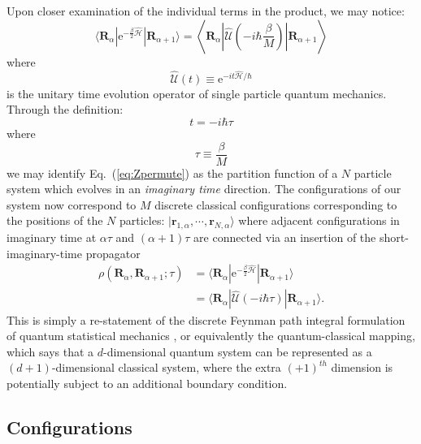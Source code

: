 \documentclass[prb,aps,amssym,nofootinbib,floatfix,notitlepage]{revtex4-1}
\renewcommand{\vec}[1]{\boldsymbol{#1}}
\newcommand{\e}[1]{\mathrm{e}^{#1}}
\renewcommand{\eqref}[1]{Eq.~(\ref{#1})}
\newcommand{\R}{\vec{R}}
\begin{document}
Upon closer examination of the individual terms in the product, we may notice:
%
\begin{equation}
    \langle \R_\alpha | \e{-\frac{\beta}{2}\hat{\mathcal{H}}} | \R_{\alpha+1}
    \rangle = 
    \left \langle \R_\alpha \left | \hat{\mathcal{U}}\left(-i \hbar
    \frac{\beta}{M}\right) \right | \R_{\alpha+1}
    \right \rangle 
\end{equation}
%
where 
%
\begin{equation}
    \hat{\mathcal{U}}(t) \equiv \e{-{i t} \hat{\mathcal{H}}/\hbar}
\end{equation}
%
is the unitary time evolution operator of single particle quantum mechanics.
Through the definition:
%
\begin{equation}
t = - i \hbar \tau
\end{equation}
%
where 
%
\begin{equation}
    \tau \equiv \frac{\beta}{M}
\end{equation}
%
we may identify \eqref{eq:Zpermute} as the partition function of a $N$
particle system which evolves in an \emph{imaginary time} direction. The
configurations of our system now correspond to $M$ discrete classical configurations
corresponding to the positions of the $N$ particles:
$|\vec{r}_{1,\alpha},\cdots,\vec{r}_{N,\alpha}\rangle$ where adjacent configurations
in imaginary time at $\alpha \tau$ and $(\alpha+1)\tau$ are connected via an
insertion of the short-imaginary-time propagator 
\begin{align*}
    \rho(\R_\alpha,\R_{\alpha+1};\tau) 
    &= \langle \R_\alpha| \e{-\frac{\beta}{2}\hat{\mathcal{H}}} | \R_{\alpha+1} \rangle 
     \\ 
     &= \langle \R_\alpha| \hat{\mathcal{U}}(-i \hbar \tau) | \R_{\alpha+1} \rangle.
\end{align*}
This is simply a re-statement of the discrete Feynman path integral
formulation of quantum statistical mechanics \cite{feynman1965quantum}, or
equivalently the quantum-classical mapping, which says that a $d$-dimensional
quantum system can be represented as a $(d+1)$-dimensional classical system,
where the extra $(+1)^{th}$ dimension is potentially subject to an additional
boundary condition.

\subsection{Configurations}
\label{sec:configurations}
\end{document}
